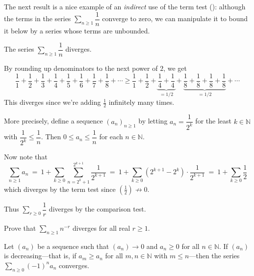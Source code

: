 The next result is a nice example of an \textit{indirect} use of the term test (): although the terms in the series $\displaystyle \sum_{n \ge 1} \dfrac{1}{n}$ converge to zero, we can manipulate it to bound it below by a series whose terms are unbounded.

\begin{theorem}
\label{thmHarmonicSeriesDiverges}
The series $\displaystyle \sum_{n \ge 1} \dfrac{1}{n}$ diverges.
\end{theorem}

\begin{cproof}
By rounding up denominators to the next power of $2$, we get
\[ \frac{1}{1} + \frac{1}{2} + \frac{1}{3} + \frac{1}{4} + \frac{1}{5} + \frac{1}{6} + \frac{1}{7} + \frac{1}{8} + \cdots \ge \frac{1}{1} + \frac{1}{2} + \underbrace{\frac{1}{4} + \frac{1}{4}}_{=1/2} + 
\underbrace{\frac{1}{8} + \frac{1}{8} + \frac{1}{8} + \frac{1}{8}}_{=1/2} + \cdots \]
This diverges since we're adding $\frac{1}{2}$ infinitely many times.

More precisely, define a sequence $(a_n)_{n \ge 1}$ by letting $a_n = \dfrac{1}{2^k}$ for the least $k \in \mathbb{N}$ with $\dfrac{1}{2^k} \le \dfrac{1}{n}$. Then $0 \le a_n \le \dfrac{1}{n}$ for each $n \in \mathbb{N}$.

Now note that
\[ \sum_{n \ge 1} a_n ~=~ 1 + \sum_{k \ge 0} \sum_{n=2^k+1}^{2^{k+1}} \dfrac{1}{2^{k+1}} ~=~ 1 + \sum_{k \ge 0} (2^{k+1}-2^k) \cdot \dfrac{1}{2^{k+1}} ~=~ 1 + \sum_{k \ge 0} \frac{1}{2} \]
which diverges by the term test since $(\frac{1}{2}) \nrightarrow 0$.

Thus $\sum_{r \ge 0} \dfrac{1}{r}$ diverges by the comparison test.
\end{cproof}

\begin{exercise}
Prove that $\displaystyle \sum_{n \ge 1} n^{-r}$ diverges for all real $r \ge 1$.
\end{exercise}

\begin{theorem}
\label{thmAlternatingSeriesTest}
Let $(a_n)$ be a sequence such that $(a_n) \to 0$ and $a_n \ge 0$ for all $n \in \mathbb{N}$. If $(a_n)$ is decreasing---that is, if $a_m \ge a_n$ for all $m,n \in \mathbb{N}$ with $m \le n$---then the series $\displaystyle \sum_{n \ge 0} (-1)^n a_n$ converges.
\end{theorem}

